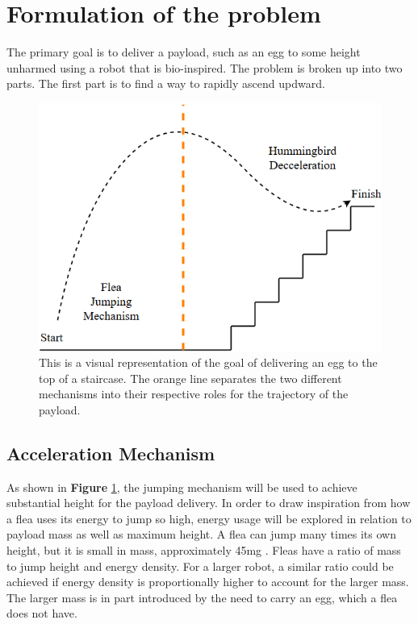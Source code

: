 \section{Formulation of the problem}
\label{Formulation}

\indent The primary goal is to deliver a payload, such as an egg to some height unharmed using a robot that is bio-inspired. The problem is broken up into two parts. The first part is to find a way to rapidly ascend updward.\\

\begin{figure}[H]
\begin{center}
\includegraphics[width=0.75\linewidth]{./Figures/trajectory.png}
\caption{This is a visual representation of the goal of delivering an egg to the top of a staircase. The orange line separates the two different mechanisms into their respective roles for the trajectory of the payload.}
\label{fig:trajectory}
\end{center}
\end{figure}

\subsection{Acceleration Mechanism}
\indent As shown in \textbf{Figure} \ref{fig:trajectory}, the jumping mechanism will be used to achieve substantial height for the payload delivery. In order to draw inspiration from how a flea uses its energy to jump so high, energy usage will be explored in relation to payload mass as well as maximum height. A flea can jump many times its own height, but it is small in mass, approximately 45mg \cite[p.~63]{bennet-clark_jump_nodate}. Fleas have a ratio of mass to jump height and energy density. For a larger robot, a similar ratio could be achieved if energy density is proportionally higher to account for the larger mass. The larger mass is in part introduced by the need to carry an egg, which a flea does not have.\\

